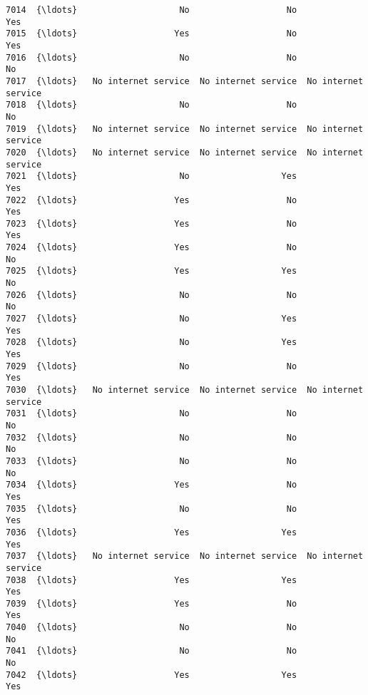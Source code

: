 \documentclass[11pt]{article}
\begin{document}
\begin{tcolorbox}[breakable, boxrule=.5pt, size=fbox, pad at break*=1mm, opacityfill=0]
\begin{Verbatim}[commandchars=\\\{\}]
7014  {\ldots}                    No                   No                  Yes
7015  {\ldots}                   Yes                   No                  Yes
7016  {\ldots}                    No                   No                   No
7017  {\ldots}   No internet service  No internet service  No internet service
7018  {\ldots}                    No                   No                   No
7019  {\ldots}   No internet service  No internet service  No internet service
7020  {\ldots}   No internet service  No internet service  No internet service
7021  {\ldots}                    No                  Yes                  Yes
7022  {\ldots}                   Yes                   No                  Yes
7023  {\ldots}                   Yes                   No                  Yes
7024  {\ldots}                   Yes                   No                   No
7025  {\ldots}                   Yes                  Yes                   No
7026  {\ldots}                    No                   No                   No
7027  {\ldots}                    No                  Yes                  Yes
7028  {\ldots}                    No                  Yes                  Yes
7029  {\ldots}                    No                   No                  Yes
7030  {\ldots}   No internet service  No internet service  No internet service
7031  {\ldots}                    No                   No                   No
7032  {\ldots}                    No                   No                   No
7033  {\ldots}                    No                   No                   No
7034  {\ldots}                   Yes                   No                  Yes
7035  {\ldots}                    No                   No                  Yes
7036  {\ldots}                   Yes                  Yes                  Yes
7037  {\ldots}   No internet service  No internet service  No internet service
7038  {\ldots}                   Yes                  Yes                  Yes
7039  {\ldots}                   Yes                   No                  Yes
7040  {\ldots}                    No                   No                   No
7041  {\ldots}                    No                   No                   No
7042  {\ldots}                   Yes                  Yes                  Yes


\end{Verbatim}
\end{tcolorbox}
\end{document}
